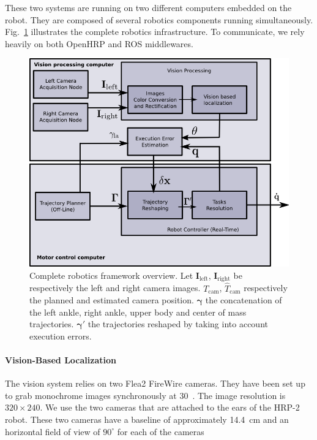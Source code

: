 These two systems are running on two different computers embedded on the robot. They are composed of several robotics components running simultaneously. Fig.~\ref{fig:framework_overview} illustrates the
complete robotics infrastructure. To communicate, we rely heavily on both OpenHRP and ROS middlewares.
%
\begin{figure}[ht!]
  \begin{center}
    \includegraphics[width=\linewidth]{images/rss_framework.png}
  \end{center}
  \caption{Complete robotics framework overview. Let $\mathbf{I}_{\text{left}}$, $\mathbf{I}_{\text{right}}$ be respectively the left and right camera images. $\mathit{T}_{\text{cam}}$, $\mathit{\hat{T}}_{\text{cam}}$ respectively the planned and estimated camera position. $\mathbf{\gamma}$ the concatenation of the left ankle, right ankle, upper body and center of mass trajectories. $\mathbf{\gamma'}$ the trajectories reshaped by taking into account execution errors.\label{fig:framework_overview}}
\end{figure}
%
\paragraph{Vision-Based Localization}
The vision system relies on two Flea2 FireWire cameras. They have been set up to grab monochrome images synchronously at 30~\hertz. The image resolution is $320 \times 240$. We use the two cameras that are attached to the ears of the HRP-2 robot. These two cameras have a baseline of approximately 14.4~cm and an horizontal field of view of $90^{\circ}$ for each of the cameras

